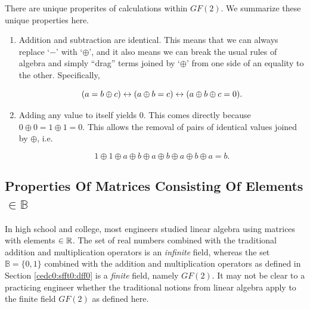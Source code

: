 There are unique properites of calculations within
$GF(2)$.  We summarize these unique properties here.

\begin{enumerate}
\item \label{prop:enum:cedc0:sfft0:dff0:01:01}
      Addition and subtraction
      are identical.  This means that we can always replace `$-$' with `$\oplus$',
      and it also means we can break the usual rules of algebra and simply
      ``drag'' terms joined by `$\oplus$' from one side of an equality to the other.
      Specifically, 

      \begin{equation}
      \label{eq:cedc0:sfft0:dff0:01}
      (a = b \oplus c) \leftrightarrow (a \oplus b = c) \leftrightarrow (a \oplus b \oplus c = 0) .
      \end{equation}

\item \label{prop:enum:cedc0:sfft0:dff0:01:02}
      Adding any value to itself
      yields $0$.  This comes directly because $0 \oplus 0 = 1 \oplus 1=0$.
      This allows the removal of pairs of identical values joined by 
      $\oplus$, i.e. 

      \begin{equation}
      \label{eq:cedc0:sfft0:dff0:02}
      1 \oplus 1 \oplus a \oplus b \oplus a \oplus b \oplus a \oplus b \oplus a = b.
      \end{equation}
\end{enumerate}


\subsection[Properties Of Matrices Consisting Of Elements \mbox{\protect$\in \mathbb{B}$}]
           {Properties Of Matrices Consisting Of Elements \mbox{\protect\boldmath$\in \mathbb{B}$}}
\label{cedc0:sfft0:rmc0}

In high school and college, most engineers studied linear algebra using 
matrices with elements $\in {\mathbb{R}}$.  The set of real numbers combined
with the traditional addition and multiplication operators is
an \emph{infinite} field, whereas the set $\mathbb{B} = \{ 0, 1 \}$ combined
with the addition and multiplication operators as defined in
Section \ref{cedc0:sfft0:dff0} is a \emph{finite} field, namely 
$GF(2)$.  It may not be clear to a practicing engineer whether the traditional notions
from linear algebra apply to the finite field $GF(2)$ as 
defined here.

